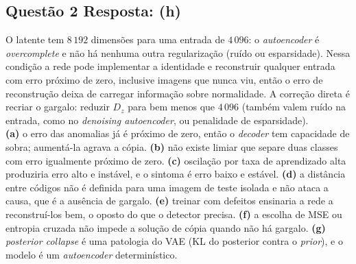\documentclass[11pt,a4paper]{article}
\begin{document}
\subsection*{Questão 2 \textemdash{} Resposta: (h)}
O latente tem $8\,192$ dimensões para uma entrada de $4\,096$: o \textit{autoencoder} é \textit{overcomplete} e não há nenhuma outra regularização (ruído ou esparsidade). Nessa condição a rede pode implementar a identidade e reconstruir qualquer entrada com erro próximo de zero, inclusive imagens que nunca viu, então o erro de reconstrução deixa de carregar informação sobre normalidade. A correção direta é recriar o gargalo: reduzir $D_z$ para bem menos que $4\,096$ (também valem ruído na entrada, como no \textit{denoising autoencoder}, ou penalidade de esparsidade).\\
\textbf{(a)} o erro das anomalias já é próximo de zero, então o \textit{decoder} tem capacidade de sobra; aumentá-la agrava a cópia.
\textbf{(b)} não existe limiar que separe duas classes com erro igualmente próximo de zero.
\textbf{(c)} oscilação por taxa de aprendizado alta produziria erro alto e instável, e o sintoma é erro baixo e estável.
\textbf{(d)} a distância entre códigos não é definida para uma imagem de teste isolada e não ataca a causa, que é a ausência de gargalo.
\textbf{(e)} treinar com defeitos ensinaria a rede a reconstruí-los bem, o oposto do que o detector precisa.
\textbf{(f)} a escolha de MSE ou entropia cruzada não impede a solução de cópia quando não há gargalo.
\textbf{(g)} \textit{posterior collapse} é uma patologia do VAE (KL do posterior contra o \textit{prior}), e o modelo é um \textit{autoencoder} determinístico.
\end{document}
